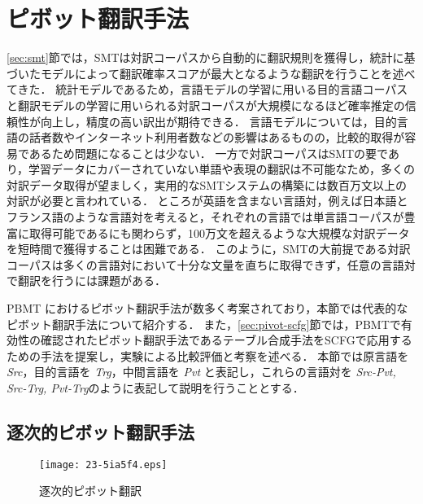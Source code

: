 \documentclass[japanese]{jnlp_1.4}
\begin{document}
\section{ピボット翻訳手法}
\label{sec:pivot-methods}

\ref{sec:smt}節では，SMTは対訳コーパスから自動的に翻訳規則を獲得し，統計に基づいたモデルによって翻訳確率スコアが最大となるような翻訳を行うことを述べてきた．
統計モデルであるため，言語モデルの学習に用いる目的言語コーパスと翻訳モデルの学習に用いられる対訳コーパスが大規模になるほど確率推定の信頼性が向上し，精度の高い訳出が期待できる．
言語モデルについては，目的言語の話者数やインターネット利用者数などの影響はあるものの，比較的取得が容易であるため問題になることは少ない．
一方で対訳コーパスはSMTの要であり，学習データにカバーされていない単語や表現の翻訳は不可能なため，多くの対訳データ取得が望ましく，実用的なSMTシステムの構築には数百万文以上の対訳が必要と言われている．
ところが英語を含まない言語対，例えば日本語とフランス語のような言語対を考えると，それぞれの言語では単言語コーパスが豊富に取得可能であるにも関わらず，100万文を超えるような大規模な対訳データを短時間で獲得することは困難である．
このように，SMTの大前提である対訳コーパスは多くの言語対において十分な文量を直ちに取得できず，任意の言語対で翻訳を行うには課題がある．

PBMT におけるピボット翻訳手法が数多く考案されており，本節では代表的なピボット翻訳手法について紹介する．
また，\ref{sec:pivot-scfg}節では，PBMTで有効性の確認されたピボット翻訳手法であるテーブル合成手法をSCFGで応用するための手法を提案し，実験による比較評価と考察を述べる．
本節では原言語を\textit{Src}，目的言語を \textit{Trg}，中間言語を \textit{Pvt} と表記し，これらの言語対を \textit{Src-Pvt, Src-Trg, Pvt-Trg}のように表記して説明を行うこととする．


\subsection{逐次的ピボット翻訳手法}
\label{sec:cascade}

\begin{figure}[b]
\begin{center}
\texttt{[image: 23-5ia5f4.eps]}
\end{center}
\caption{逐次的ピボット翻訳}
\label{fig:pivot-cascade}
\end{figure}
\end{document}

